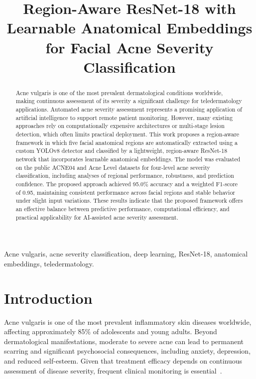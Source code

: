 \documentclass[conference]{IEEEtran}
\title{Region-Aware ResNet-18 with Learnable Anatomical Embeddings for Facial Acne Severity Classification}
\begin{document}
\maketitle

\begin{abstract}
Acne vulgaris is one of the most prevalent dermatological conditions worldwide, making continuous assessment of its severity a significant challenge for teledermatology applications. Automated acne severity assessment represents a promising application of artificial intelligence to support remote patient monitoring. However, many existing approaches rely on computationally expensive architectures or multi-stage lesion detection, which often limits practical deployment. This work proposes a region-aware framework in which five facial anatomical regions are automatically extracted using a custom YOLOv8 detector and classified by a lightweight, region-aware ResNet-18 network that incorporates learnable anatomical embeddings. The model was evaluated on the public ACNE04 and Acne Level datasets for four-level acne severity classification, including analyses of regional performance, robustness, and prediction confidence. The proposed approach achieved 95.0\% accuracy and a weighted F1-score of 0.95, maintaining consistent performance across facial regions and stable behavior under slight input variations. These results indicate that the proposed framework offers an effective balance between predictive performance, computational efficiency, and practical applicability for AI-assisted acne severity assessment.
\end{abstract}

\begin{IEEEkeywords}
Acne vulgaris, acne severity classification, deep learning, ResNet-18, anatomical embeddings, teledermatology.
\end{IEEEkeywords}

\section{Introduction}
Acne vulgaris is one of the most prevalent inflammatory skin diseases worldwide, affecting approximately 85\% of adolescents and young adults. Beyond dermatological manifestations, moderate to severe acne can lead to permanent scarring and significant psychosocial consequences, including anxiety, depression, and reduced self-esteem. Given that treatment efficacy depends on continuous assessment of disease severity, frequent clinical monitoring is essential~\cite{vasam2023,yli2024}.
\end{document}
